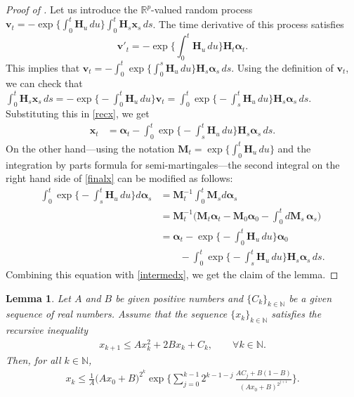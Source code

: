 \documentclass[aoap,preprint,reqno,a4paper]{imsart} %
\newcommand{\RR}{\mathbb{R}}
\newcommand{\NN}{\mathbb{N}}
\newcommand{\balpha}{\boldsymbol{\alpha}}
\newcommand{\bfH}{\mathbf H}
\newcommand{\bfM}{\mathbf M}
\newcommand{\bv}{\boldsymbol v}
\newcommand{\bx}{\boldsymbol x}
\newtheorem{lemma}{Lemma}
\begin{document}
\begin{proof}[Proof of ]
Let us introduce the $\RR^p$-valued random process
$\bv_t = -\exp\big\{\int_0^t\bfH_u\,du\big\}\int_0^t \bfH_s\bx_s\,ds$.
The time derivative of this process satisfies
$$
\bv'_t = - \exp\Big\{\int_0^t\bfH_u\,du\Big\}\bfH_t\balpha_t.
$$
This implies that $\bv_t = - \int_0^t\exp\big\{\int_0^s\bfH_u\,du\big\}\bfH_s\balpha_s\,ds$. Using the definition of
$\bv_t$,  we can check that
$\int_0^t \bfH_s\bx_s\,ds = -\exp\big\{-\int_0^t\bfH_u\,du\big\}\bv_t =
\int_0^t\exp\big\{-\int_s^t\bfH_u\,du\big\}\bfH_s\balpha_s\,ds$. Substituting this in \eqref{recx}, we get
\begin{align}\label{intermedx}
\bx_t
		&= \balpha_t -\int_0^t\exp\big\{-\int_s^t\bfH_u\,du\big\}\bfH_s\balpha_s\,ds.
\end{align}
On the other hand---using the notation $\bfM_t = \exp\big\{\int_0^t\bfH_u\,du\big\}$ and
the integration by parts formula for semi-martingales---the second integral on the right hand side of \eqref{finalx} can be
modified as follows:
\begin{align}
\int_0^t \exp\Big\{-\int_s^t\bfH_u\,du\Big\}d\balpha_s
		& = \bfM_t^{-1}\int_0^t \bfM_sd\balpha_s\\
		& = \bfM_t^{-1}\Big(\bfM_t\balpha_t-\bfM_0\balpha_0-\int_0^t d\bfM_s\,\balpha_s\Big)\\
		&= \balpha_t - \exp\Big\{-\int_0^t\bfH_u\,du\Big\}\balpha_0 \\
		&\qquad	- \int_0^t \exp\Big\{-\int_s^t\bfH_u\,du\Big\}\bfH_s\balpha_s\,ds.
\end{align}
Combining this equation with \eqref{intermedx}, we get the claim of the lemma.
\end{proof}

\begin{lemma}\label{lemH} Let $A$ and $B$ be given positive numbers and $\{C_k\}_{k\in\NN}$ be a given sequence
of real numbers. Assume that the sequence $\{x_k\}_{k\in\NN}$ satisfies the recursive inequality
\begin{align}
x_{k+1} \le Ax_k^2+2Bx_k+C_k,\qquad \forall k\in\NN.
\end{align}
Then, for all $k\in\NN$,
\begin{align}
x_k \le \frac1A \big(Ax_0+B\big)^{2^k}\exp\bigg\{\sum_{j=0}^{k-1} 2^{k-1-j}\,
		\frac{AC_j+B(1-B)}{(Ax_0+B)^{2^{j+1}}}\bigg\}.
\end{align}
\end{lemma}
\end{document}
